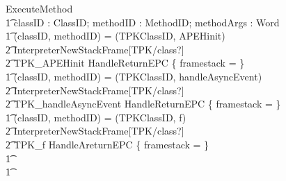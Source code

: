 \begin{figure}[t!]
  \centering
  \setlength{\zedtab}{0.4cm}
  \setlength{\zedindent}{0pt}
  \setlength{\zedleftsep}{0pt}
  \setlength{\abovedisplayskip}{0pt}
  \setlength{\belowdisplayskip}{0pt}
  \setlength{\abovedisplayshortskip}{0pt}
  \setlength{\belowdisplayshortskip}{0pt}
  \begin{circusaction}
    ExecuteMethod \circdef \\
    \t1 \circval classID : ClassID; \circval methodID : MethodID; \circval methodArgs : \seq Word \circspot \\
    \t1 \circif (classID, methodID) = (TPKClassID, APEHinit) \circthen {} \\
    \t2 InterpreterNewStackFrame[TPK/class?] \circseq \\
    \t2 TPK\_APEHinit \circseq HandleReturnEPC \circseq \{ framestack = \emptyset \} \\
    \t1 {} \circelse (classID, methodID) = (TPKClassID, handleAsyncEvent) \circthen {} \\
    \t2 InterpreterNewStackFrame[TPK/class?] \circseq \\
    \t2 TPK\_handleAsyncEvent \circseq HandleReturnEPC \circseq \{ framestack = \emptyset \} \\
    \t1 {} \circelse (classID, methodID) = (TPKClassID, f) \circthen {} \\
    \t2 InterpreterNewStackFrame[TPK/class?] \circseq \\
    \t2 TPK\_f \circseq HandleAreturnEPC \circseq \{ framestack = \emptyset \} \\
    \t1 {} \cdots {} \\
    \t1 \circfi
  \end{circusaction}


\end{figure}
